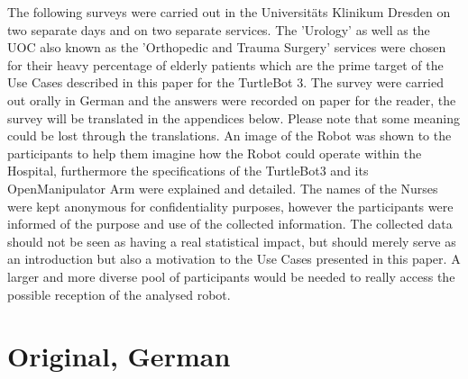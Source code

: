 \documentclass[plainarticle,zihtitle,english,final,hyperref,utf8]{zihpub}
\begin{document}
\begin{appendices}
\label{sec:appendix}

The following surveys were carried out in the Universitäts Klinikum Dresden on two separate days and on two separate services. The 'Urology' as well as the UOC also known as the 'Orthopedic and Trauma Surgery' services were chosen for their heavy percentage of elderly patients which are the prime target of the Use Cases described in this paper for the TurtleBot 3.
The survey were carried out orally in German and the answers were recorded on paper for the reader, the survey will be translated in the appendices below. Please note that some meaning could be lost through the translations. An image of the Robot was shown to the participants to help them imagine how the Robot could operate within the Hospital, furthermore the specifications of the TurtleBot3 and its OpenManipulator Arm were explained and detailed. 
The names of the Nurses were kept anonymous for confidentiality purposes, however the participants were informed of the purpose and use of the collected information. The collected data should not be seen as having a real statistical impact, but should merely serve as an introduction but also a motivation to the Use Cases presented in this paper.
A larger and more diverse pool of participants would be needed to really access the possible reception of the analysed robot.

\section{Original, German}


\end{appendices}
\end{document}
